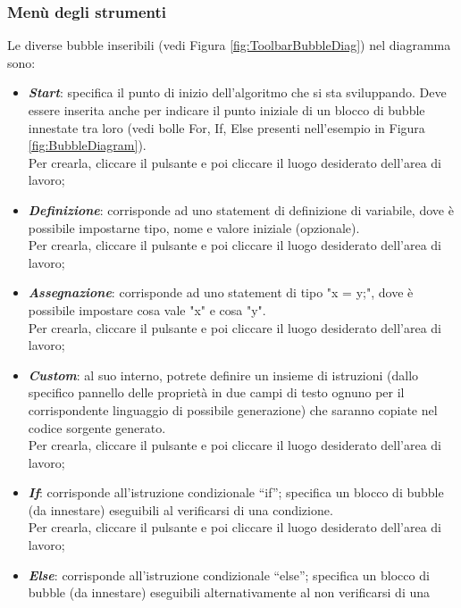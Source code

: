 \documentclass[../ManualeUtente.tex]{subfiles}
\begin{document}
			\subsubsection{Menù degli strumenti}\label{sez:BubbleDiagram-strumenti}
				Le diverse bubble inseribili (vedi Figura \ref{fig:ToolbarBubbleDiag}) nel diagramma sono:
				\begin{itemize}
					\item \textit{\textbf{Start}}: specifica il punto di inizio dell'algoritmo che si sta
					sviluppando. Deve essere inserita anche per indicare il punto iniziale di un blocco di bubble
					innestate tra loro (vedi bolle For, If, Else presenti nell'esempio in Figura
					\ref{fig:BubbleDiagram}).\\
					Per crearla, cliccare il pulsante e poi cliccare il luogo desiderato
					dell'area di lavoro;
					\item \textit{\textbf{Definizione}}: corrisponde ad uno statement di definizione di variabile,
					dove è possibile impostarne tipo, nome e valore iniziale (opzionale).\\
					Per crearla, cliccare il pulsante e poi cliccare il luogo desiderato
					dell'area di lavoro;
					\item \textit{\textbf{Assegnazione}}: corrisponde ad uno statement di tipo "x = y;", dove è
					possibile impostare cosa vale "x" e cosa "y".\\
					Per crearla, cliccare il pulsante e poi cliccare il luogo desiderato
					dell'area di lavoro;
					\item \textit{\textbf{Custom}}: al suo interno, potrete definire un insieme di istruzioni
					(dallo specifico pannello delle proprietà in due campi di testo ognuno per il corrispondente
					linguaggio di possibile generazione) che saranno copiate nel codice sorgente generato.\\
					Per crearla, cliccare il pulsante e poi cliccare il luogo desiderato
					dell'area di lavoro;
					\item \textit{\textbf{If}}: corrisponde all'istruzione condizionale ``if''; specifica un blocco
					di bubble (da innestare) eseguibili al verificarsi di una condizione.\\
					Per crearla, cliccare il pulsante e poi cliccare il luogo desiderato
					dell'area di lavoro;
					\item \textit{\textbf{Else}}: corrisponde all'istruzione condizionale ``else''; specifica un
					blocco di bubble (da innestare) eseguibili alternativamente al non	verificarsi di una

\end{itemize}
\end{document}
